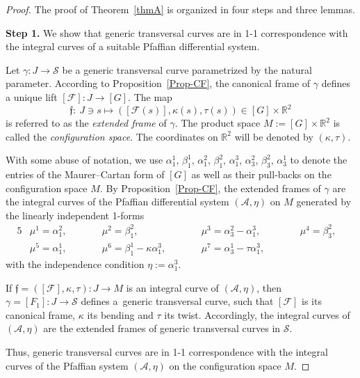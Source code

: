\documentclass[pdftex]{sigma}
\numberwithin{equation}{section}
\def\R{\mathbb{R}}
\def\S{\mathcal{S}}
\def\F{\mathcal{F}}
\def\S{\mathcal{S}}
\begin{document}
\begin{proof}
The proof of Theorem~\ref{thmA} is organized in four steps and three lemmas.

\textbf{Step 1.} We show that generic transversal curves are in 1-1 correspondence
with the integral curves of a suitable Pfaffian differential system.

Let $\gamma \colon J \to \S$ be a generic transversal curve parametrized by the natural parameter.
According to Proposition~\ref{Prop-CF}, the canonical frame of $\gamma$ defines a unique lift
$[\mathcal{F}] \colon J \to [G]$.
%
The map
\[
 \mathfrak{f} \colon \ J\ni s\longmapsto ( [\F(s)], \kappa(s), \tau(s))\in [G]\times\R^2
 \]
is referred to as the \textit{extended frame} of $\gamma$.
%
The product space $M := [G]\times\R^2$ is called the \emph{configuration space}. The coordinates
on $\R^2$ will be denoted by $(\kappa, \tau)$.
%

With some abuse of notation,
we use $\alpha_1^1$, $\beta_1^1$, $\alpha_1^2$, $\beta_1^2$, $\alpha_1^3$,
$\alpha_3^2$, $\beta_3^2$, $\alpha_3^1$ to denote the entries of the Maurer--Cartan form of $[{G}]$
as well as their pull-backs on the configuration space $M$.
%
By Proposition~\ref{Prop-CF}, the extended frames of $\gamma$ are the integral curves of the Pfaffian
differential system $(\mathcal A, \eta)$ on $M$ generated by the
linearly independent 1-forms
\begin{alignat*}{5}
 & \mu^1=\alpha_1^2,\qquad && \mu^2=\beta_1^2 ,\qquad && \mu^3= \alpha_3^2- {\alpha^3_1},\qquad && \mu^4=\beta_3^2 , & \\
 & \mu^5=\alpha_1^1 ,\qquad && \mu^6=\beta_1^1-\kappa \alpha_1^3,\qquad && \mu^7 =\alpha_3^1-\tau\alpha_1^3,\qquad  &
\end{alignat*}
with the independence condition $\eta :=\alpha_1^3$.

If $\mathfrak{f} = ( [\F], \kappa, \tau) \colon J \to M$ is an integral curve of $(\mathcal{A}, \eta)$, then
$\gamma = [F_1] \colon J \to \mathcal S$ defines a~generic transversal curve, such that $[\F]$ is its canonical frame,
$\kappa$ its bending and $\tau$ its twist.
Accordingly, the integral curves of $(\mathcal{A},\eta)$ are the extended frames of generic transversal curves
in $\mathcal S$.

Thus, generic transversal curves are in 1-1 correspondence with the integral curves of the Pfaffian system
$(\mathcal{A},\eta)$ on the configuration space $M$.


\end{proof}
\end{document}
